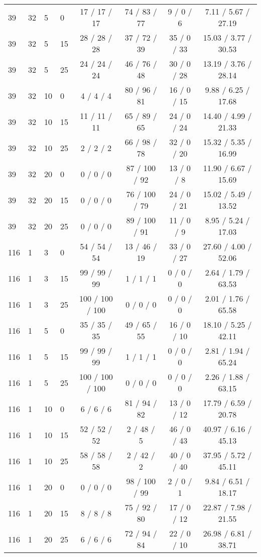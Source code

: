 \begin{table}[p]
\begin{tabular}{llllcccc}
39 & 32 & 5 & 0 & 17 / 17 / 17 & 74 / 83 / 77 & 9 / 0 / 6 & 7.11 / 5.67 / 27.19 \\
39 & 32 & 5 & 15 & 28 / 28 / 28 & 37 / 72 / 39 & 35 / 0 / 33 & 15.03 / 3.77 / 30.53 \\
39 & 32 & 5 & 25 & 24 / 24 / 24 & 46 / 76 / 48 & 30 / 0 / 28 & 13.19 / 3.76 / 28.14 \\
39 & 32 & 10 & 0 & 4 / 4 / 4 & 80 / 96 / 81 & 16 / 0 / 15 & 9.88 / 6.25 / 17.68 \\
39 & 32 & 10 & 15 & 11 / 11 / 11 & 65 / 89 / 65 & 24 / 0 / 24 & 14.40 / 4.99 / 21.33 \\
39 & 32 & 10 & 25 & 2 / 2 / 2 & 66 / 98 / 78 & 32 / 0 / 20 & 15.32 / 5.35 / 16.99 \\
39 & 32 & 20 & 0 & 0 / 0 / 0 & 87 / 100 / 92 & 13 / 0 / 8 & 11.90 / 6.67 / 15.69 \\
39 & 32 & 20 & 15 & 0 / 0 / 0 & 76 / 100 / 79 & 24 / 0 / 21 & 15.02 / 5.49 / 13.52 \\
39 & 32 & 20 & 25 & 0 / 0 / 0 & 89 / 100 / 91 & 11 / 0 / 9 & 8.95 / 5.24 / 17.03 \\
116 & 1 & 3 & 0 & 54 / 54 / 54 & 13 / 46 / 19 & 33 / 0 / 27 & 27.60 / 4.00 / 52.06 \\
116 & 1 & 3 & 15 & 99 / 99 / 99 & 1 / 1 / 1 & 0 / 0 / 0 & 2.64 / 1.79 / 63.53 \\
116 & 1 & 3 & 25 & 100 / 100 / 100 & 0 / 0 / 0 & 0 / 0 / 0 & 2.01 / 1.76 / 65.58 \\
116 & 1 & 5 & 0 & 35 / 35 / 35 & 49 / 65 / 55 & 16 / 0 / 10 & 18.10 / 5.25 / 42.11 \\
116 & 1 & 5 & 15 & 99 / 99 / 99 & 1 / 1 / 1 & 0 / 0 / 0 & 2.81 / 1.94 / 65.24 \\
116 & 1 & 5 & 25 & 100 / 100 / 100 & 0 / 0 / 0 & 0 / 0 / 0 & 2.26 / 1.88 / 63.15 \\
116 & 1 & 10 & 0 & 6 / 6 / 6 & 81 / 94 / 82 & 13 / 0 / 12 & 17.79 / 6.59 / 20.78 \\
116 & 1 & 10 & 15 & 52 / 52 / 52 & 2 / 48 / 5 & 46 / 0 / 43 & 40.97 / 6.16 / 45.13 \\
116 & 1 & 10 & 25 & 58 / 58 / 58 & 2 / 42 / 2 & 40 / 0 / 40 & 37.95 / 5.72 / 45.11 \\
116 & 1 & 20 & 0 & 0 / 0 / 0 & 98 / 100 / 99 & 2 / 0 / 1 & 9.84 / 6.51 / 18.17 \\
116 & 1 & 20 & 15 & 8 / 8 / 8 & 75 / 92 / 80 & 17 / 0 / 12 & 22.87 / 7.98 / 21.55 \\
116 & 1 & 20 & 25 & 6 / 6 / 6 & 72 / 94 / 84 & 22 / 0 / 10 & 26.98 / 6.81 / 38.71 \\

\end{tabular}
\end{table}
